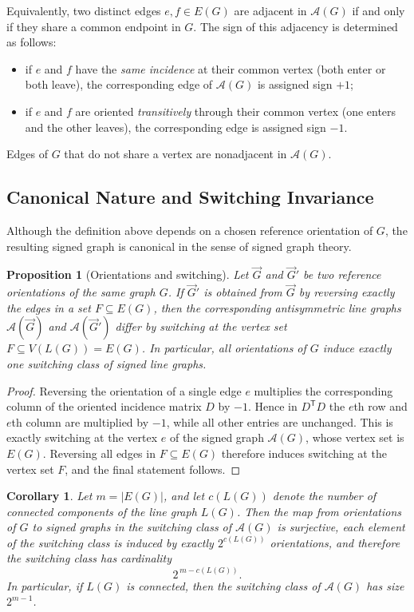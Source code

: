 \documentclass[11pt]{article}
\newtheorem{corollary}{Corollary}
\newtheorem{proposition}{Proposition}
\theoremstyle{plain}
\begin{document}
Equivalently, two distinct edges $e,f\in E(G)$ are adjacent in
$\mathcal{A}(G)$ if and only if they share a common endpoint in $G$.
The sign of this adjacency is determined as follows:
\begin{itemize}
  \item if $e$ and $f$ have the \emph{same incidence} at their common vertex
  (both enter or both leave), the corresponding edge of
  $\mathcal{A}(G)$ is assigned sign $+1$;
  \item if $e$ and $f$ are oriented \emph{transitively} through their common
  vertex (one enters and the other leaves), the corresponding edge is
  assigned sign $-1$.
\end{itemize}
Edges of $G$ that do not share a vertex are nonadjacent in
$\mathcal{A}(G)$.

\subsection{Canonical Nature and Switching Invariance}

Although the definition above depends on a chosen reference orientation of $G$,
the resulting signed graph is canonical in the sense of signed graph theory.

\begin{proposition}[Orientations and switching]
\label{prop:switching}
Let $\vec{G}$ and $\vec{G}'$ be two reference orientations of the same graph $G$.
If $\vec{G}'$ is obtained from $\vec{G}$ by reversing exactly the edges in a set
$F\subseteq E(G)$, then the corresponding antisymmetric line graphs
$\mathcal{A}(\vec{G})$ and $\mathcal{A}(\vec{G}')$ differ by switching at the
vertex set $F\subseteq V(L(G))=E(G)$.
In particular, all orientations of $G$ induce exactly one switching class of
signed line graphs.
\end{proposition}

\begin{proof}
Reversing the orientation of a single edge $e$ multiplies the corresponding
column of the oriented incidence matrix $D$ by $-1$. Hence in $D^{\mathsf T}D$
the $e$th row and $e$th column are multiplied by $-1$, while all other entries
are unchanged. This is exactly switching at the vertex $e$ of the signed graph
$\mathcal A(G)$, whose vertex set is $E(G)$. Reversing all edges in
$F\subseteq E(G)$ therefore induces switching at the vertex set $F$, and the
final statement follows.
\end{proof}

\begin{corollary}
\label{cor:switching-class-size}
Let $m=|E(G)|$, and let $c(L(G))$ denote the number of connected components of
the line graph $L(G)$. Then the map from orientations of $G$ to signed graphs in
the switching class of $\mathcal A(G)$ is surjective, each element of the
switching class is induced by exactly $2^{c(L(G))}$ orientations, and therefore
the switching class has cardinality
\[
2^{\,m-c(L(G))}.
\]
In particular, if $L(G)$ is connected, then the switching class of
$\mathcal A(G)$ has size $2^{m-1}$.
\end{corollary}
\end{document}
